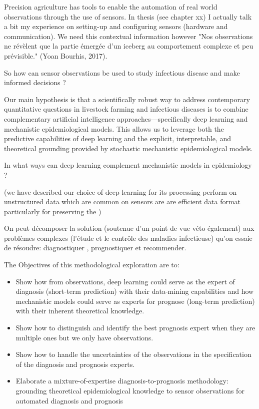 Precision agriculture has tools to enable the automation of real world observations through the use of sensors. In thesis (see chapter xx) I actually talk a bit my experience on setting-up and configuring sensors (hardware and communication). We need this contextual information however "Nos observations ne révèlent que la partie émergée d’un iceberg au comportement complexe et peu prévisible." (Yoan Bourhis, 2017). 

So how can sensor observations be used to study infectious disease and make informed decisions ?

Our main hypothesis is that a scientifically robust way to address contemporary quantitative questions in livestock farming and infectious diseases is to combine complementary artificial intelligence approaches—specifically deep learning and mechanistic epidemiological models. This allows us to leverage both the predictive capabilities of deep learning and the explicit, interpretable, and theoretical grounding provided by stochastic mechanistic epidemiological models.

In what ways can deep learning complement mechanistic models in epidemiology ?


(we have described our choice of deep learning for its processing perform on unstructured data which are common on sensors are are efficient data format particularly for preserving the )

On peut décomposer la solution (soutenue d'un point de vue véto également) aux problèmes complexes (l'étude et le contrôle des maladies infectieuse) qu'on essaie de résoudre: diagnostiquer , prognostiquer et recommender.


The Objectives of this methodological exploration are to:
\begin{itemize}
    \item Show how from observations, deep learning could serve as the expert of diagnosis (short-term prediction) with their data-mining capabilities and how mechanistic models could serve as experts for prognose (long-term prediction) with their inherent theoretical knowledge. 
    \item Show how to distinguish and identify the best prognosis expert when they are multiple ones but we only have observations. 
    \item Show how to handle the uncertainties of the observations in the specification of the  diagnosis and prognosis experts.
    \item Elaborate a mixture-of-expertise diagnosis-to-prognosis methodology: grounding theoretical epidemiological knowledge to sensor observations for automated diagnosis and prognosis 
\end{itemize}

